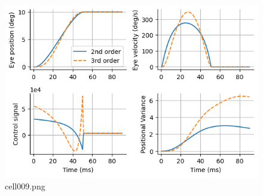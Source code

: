 \begin{figure}[ht]
	\centering
	\includegraphics[scale=0.8, max width=\linewidth]{./fig/motor-learning/minimum-variance/cell009.png}
	\caption{cell009.png}
	\label{cell009.png}
\end{figure}